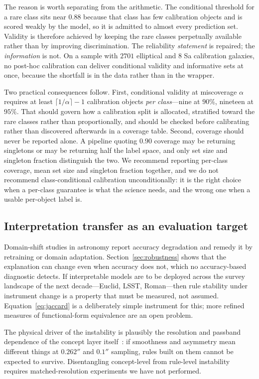 \documentclass[11pt]{article}
\begin{document}
The reason is worth separating from the arithmetic. The conditional threshold
for a rare class sits near $0.88$ because that class has few calibration
objects and is scored weakly by the model, so it is admitted to almost every
prediction set. Validity is therefore achieved by keeping the rare classes
perpetually available rather than by improving discrimination. The reliability
\emph{statement} is repaired; the \emph{information} is not. On a sample with
$2701$ elliptical and $8$ Sa calibration galaxies, no post-hoc calibration can
deliver conditional validity and informative sets at once, because the
shortfall is in the data rather than in the wrapper.

Two practical consequences follow. First, conditional validity at miscoverage
$\alpha$ requires at least $\lceil 1/\alpha \rceil - 1$ calibration objects
\emph{per class}---nine at $90\%$, nineteen at $95\%$. That should govern how a
calibration split is allocated, stratified toward the rare classes rather than
proportionally, and should be checked before calibrating rather than
discovered afterwards in a coverage table. Second, coverage should never be
reported alone. A pipeline quoting $0.90$ coverage may be returning singletons
or may be returning half the label space, and only set size and singleton
fraction distinguish the two. We recommend reporting per-class coverage, mean
set size and singleton fraction together, and we do not recommend
class-conditional calibration unconditionally: it is the right choice when a
per-class guarantee is what the science needs, and the wrong one when a usable
per-object label is.

\subsection{Interpretation transfer as an evaluation target}

Domain-shift studies in astronomy report accuracy degradation and remedy it by
retraining or domain adaptation. Section~\ref{sec:robustness} shows that the
explanation can change even when accuracy does not, which no accuracy-based
diagnostic detects. If interpretable models are to be deployed across the
survey landscape of the next decade---Euclid, LSST, Roman---then rule
stability under instrument change is a property that must be measured, not
assumed. Equation~\eqref{eq:jaccard} is a deliberately simple instrument for
this; more refined measures of functional-form equivalence are an open
problem.

The physical driver of the instability is plausibly the resolution and
passband dependence of the concept layer itself~\citep{ferrari2015}: if
smoothness and asymmetry mean different things at $0.262''$ and $0.1''$
sampling, rules built on them cannot be expected to survive. Disentangling
concept-level from rule-level instability requires matched-resolution
experiments we have not performed.
\end{document}
